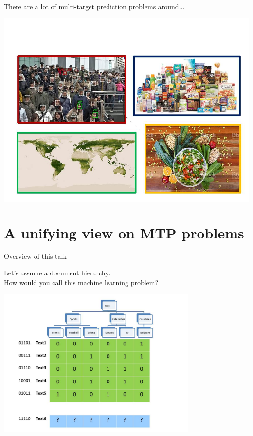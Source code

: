 \documentclass[]{beamer}
\begin{document}
\begin{frame}{There are a lot of multi-target prediction problems around...}

\begin{center}
\includegraphics[width=\textwidth,trim = 0 0 0 70,clip]{Figures/pictures/Slide20}
\end{center}

\end{frame}

\section{A unifying view on MTP problems}


\begin{frame}{Overview of this talk}

\tableofcontents

\end{frame}


\begin{frame}{Let's assume a document hierarchy: \\
How would you call this machine learning problem?}
\begin{center}
\includegraphics[width=0.75\textwidth,trim = 0 0 100 0,clip]{Figures/pictures/Slide5}
\end{center}
\end{frame}
\end{document}
